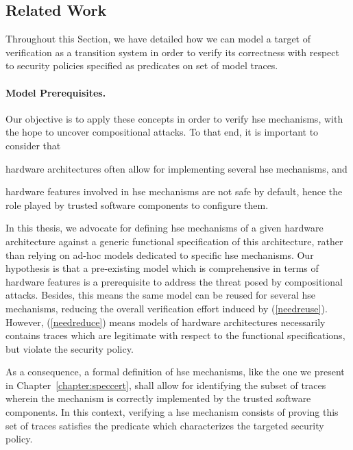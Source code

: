 
\subsection{Related Work}
\label{subsec:sota:ltsrelated}

Throughout this Section, we have detailed how we can model a target of
verification as a transition system in order to verify its correctness with
respect to security policies specified as predicates on set of model traces.

\paragraph{Model Prerequisites.}
%
Our objective is to apply these concepts in order to verify \ac{hse} mechanisms,
with the hope to uncover compositional attacks.
%
To that end, it is important to consider that
%
\begin{inparaenum}[(1)]
\item \label{needreuse}%
  hardware architectures often allow for implementing several \ac{hse}
  mechanisms, and
\item \label{needreduce}%
  hardware features involved in \ac{hse} mechanisms are not safe by default,
  hence the role played by trusted software components to configure them.
\end{inparaenum}
%
In this thesis, we advocate for defining \ac{hse} mechanisms of a given hardware
architecture against a generic functional specification of this architecture,
rather than relying on ad-hoc models dedicated to specific \ac{hse} mechanisms.
%
Our hypothesis is that a pre-existing model which is comprehensive in terms of
hardware features is a prerequisite to address the threat posed by compositional
attacks.
%
Besides, this means the same model can be reused for several \ac{hse}
mechanisms, reducing the overall verification effort induced by
(\ref{needreuse}).
%
However, (\ref{needreduce}) means models of hardware architectures necessarily
contains traces which are legitimate with respect to the functional
specifications, but violate the security policy.

As a consequence, a formal definition of \ac{hse} mechanisms, like the one we
present in Chapter~\ref{chapter:speccert}, shall allow for identifying the
subset of traces wherein the mechanism is correctly implemented by the trusted
software components.
%
In this context, verifying a \ac{hse} mechanism consists of proving this set of
traces satisfies the predicate which characterizes the targeted security policy.

